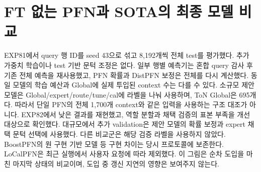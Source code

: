 \section{FT 없는 PFN과 SOTA의 최종 모델 비교}
EXP81에서 query 행 ID를 seed 43으로 섞고 8,192개씩 전체 test를 평가했다. 추가 가중치 학습이나 test 기반 문턱 조정은 없다. 일부 행별 예측기는 혼합 query 감사 후 기존 전체 예측을 재사용했고, PFN 확률과 DistPFN 보정은 전체를 다시 계산했다. 동일 모델의 학습 예산과 Global에 실제 투입된 context 수는 다를 수 있다.
소규모 제안 모델은 Global/expert/route/tune/cal에 라벨을 나눠 사용하며, ToN Global은 695개다. 따라서 단일 PFN의 전체 1,700개 context와 같은 입력을 사용하는 구조 대조가 아니다. EXP82에서 낮은 결과를 재현했고, 역할 분할과 채택 검증의 표본 부족을 개선 대상으로 확인했다.
대규모에서 추가 validation은 제안 모델의 확률 보정과 expert 채택 문턱 선택에 사용했다. 다른 비교군은 해당 검증 라벨을 사용하지 않았다. BoostPFN의 원 구현 기반 모델 등 구현 차이는 당시 프로토콜에 보존한다. LoCalPFN은 최근 실행에서 사용자 요청에 따라 제외했다. 이 그림은 순차 도입을 마친 마지막 상태의 비교이며, 도입 중 갱신 지연의 영향은 보여주지 않는다.

